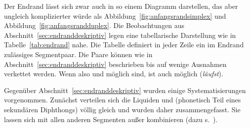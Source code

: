 

Der Endrand lässt sich zwar auch in so einem Diagramm darstellen, das aber ungleich komplizierter würde als Abbildung~\ref{fig:anfangsrandsimplex} und Abbildung~\ref{fig:anfangsrandduplex}.
Die Beobachtungen aus Abschnitt~\ref{sec:endranddeskriptiv} legen eine tabellarische Darstellung wie in Tabelle~\ref{tab:endrand} nahe.
Die Tabelle definiert in jeder Zeile ein im Endrand zulässiges Segmentpaar.
Die Paare können wie in Abschnitt~\ref{sec:endranddeskriptiv} beschrieben bis auf wenige Ausnahmen verkettet werden.
Wenn also \textipa{[fs]} und \textipa{[st]} möglich sind, ist \idR auch \textipa{[fst]} möglich (\textit{läufst}).

Gegenüber Abschnitt~\ref{sec:endranddeskriptiv} wurden einige Systematisierungen vorgenommen.
Zunächst verteilen sich die Liquiden \textipa{[l]} und \textipa{[K]} (phonetisch Teil eines sekundären Diphthongs) völlig gleich und wurden daher zusammengefasst.
Sie lassen sich mit allen anderen Segmenten außer \textipa{[X]} kombinieren (dazu s.\ ).


